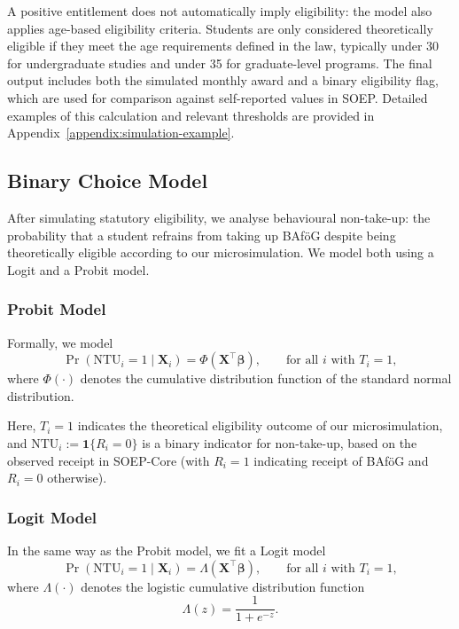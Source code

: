 A positive entitlement does not automatically imply eligibility: the model also applies age-based eligibility criteria. 
Students are only considered theoretically eligible if they meet the age requirements defined in the law, typically under 30 for undergraduate studies and under 35 for graduate-level programs. 
The final output includes both the simulated monthly award and a binary eligibility flag, which are used for comparison against self-reported values in SOEP. 
Detailed examples of this calculation and relevant thresholds are provided in Appendix~\ref{appendix:simulation-example}.



\subsection{Binary Choice Model}
After simulating statutory eligibility, we analyse behavioural non-take-up: the probability that a student refrains from taking up BAföG despite being theoretically eligible according to our microsimulation. 
We model both using a Logit and a Probit model.

\subsubsection{Probit Model}
Formally, we model
\begin{equation}
  \Pr(\mathrm{NTU}_i = 1 \mid \mathbf{X}_i) = \Phi(\mathbf{X}^\top \boldsymbol{\beta})
  , \qquad \text{for all } i \text{ with } T_i = 1,
\end{equation}
where \( \Phi(\cdot) \) denotes the cumulative distribution function of the standard normal distribution. 

Here, \( T_i = 1 \) indicates the theoretical eligibility outcome of our microsimulation, and \( \mathrm{NTU}_i := \mathbf{1}\{R_i = 0\} \) is a binary indicator for non-take-up, based on the observed receipt in SOEP-Core (with \( R_i = 1 \) indicating receipt of BAföG and \( R_i = 0 \) otherwise).

\subsubsection{Logit Model}
In the same way as the Probit model, we fit a Logit model
\begin{equation}
  \Pr(\mathrm{NTU}_i = 1 \mid \mathbf{X}_i) = \Lambda(\mathbf{X}^\top \boldsymbol{\beta})
  , \qquad \text{for all } i \text{ with } T_i = 1,
\end{equation}
where \( \Lambda(\cdot) \) denotes the logistic cumulative distribution function
\begin{equation}
  \Lambda(z) = \frac{1}{1 + e^{-z}}.
\end{equation}

